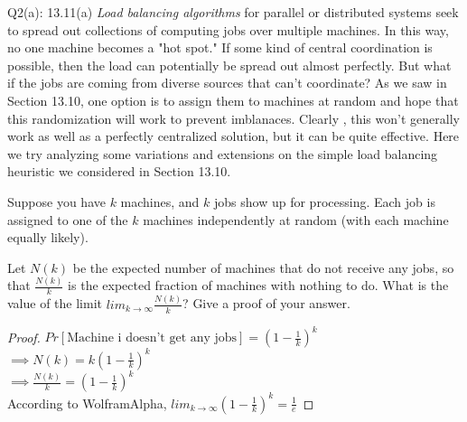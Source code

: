 \begin{problem}
  {Q2(a): 13.11(a)}
  \textit{Load balancing algorithms} for parallel or distributed systems seek to spread out collections of computing
  jobs over multiple machines. In this way, no one machine becomes a "hot spot." If some kind of central coordination is possible, then the load can
  potentially be spread out almost perfectly. But what if the jobs are coming from diverse sources that can't coordinate? As we saw in
  Section 13.10, one option is to assign them to machines at random and hope that this randomization will work to prevent imblanaces. Clearly , this
  won't generally work as well as a perfectly centralized solution, but it can be quite effective. Here we try analyzing some variations and extensions
  on the simple load balancing heuristic we considered in Section 13.10.
  
  Suppose you have $k$ machines, and $k$ jobs show up for processing. Each job is assigned to one of the $k$ machines independently at random (with
  each machine equally likely).

  Let $N(k)$ be the expected number of machines that do not receive any jobs, so that $\frac{N(k)}{k}$ is the expected fraction of machines with
  nothing to do. What is the value of the limit $lim_{k \rightarrow \infty}\frac{N(k)}{k}$? Give a proof of your answer.
  \begin{proof}
    $Pr[\text{Machine i doesn't get any jobs}] = (1 - \frac{1}{k})^k$ \\
    $\implies N(k) = k(1 - \frac{1}{k})^k$ \\
    $\implies \frac{N(k)}{k} = (1 - \frac{1}{k})^k$ \\
    According to WolframAlpha, $lim_{k \rightarrow \infty} (1 - \frac{1}{k})^k = \frac{1}{e}$
  \end{proof}
\end{problem}
